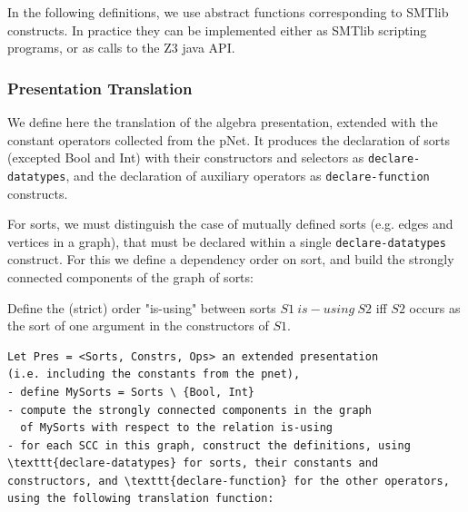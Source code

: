 \documentclass{lncs/llncs}
\newcommand{\TODO}[1]{\textcolor{red}{\textbf{[TODO:#1]}}}
\newcommand{\ERIC}[1]{\textcolor{blue}{#1}}
\begin{document}
\smallskip

In the following definitions, we use abstract functions corresponding to
SMTlib constructs. In practice they can be implemented either as
SMTlib scripting programs, or as calls to the Z3 java API.

\subsubsection{Presentation Translation} %
We define here the translation of the algebra presentation, extended
with the constant operators collected from the pNet. It produces the
declaration of sorts (excepted Bool and Int) with their constructors
and selectors as \texttt{declare-datatypes}, and the declaration of
auxiliary operators as \texttt{declare-function} constructs.

For sorts, we must distinguish the case of mutually defined sorts
(e.g. edges and vertices in a graph), that must be declared within a
single \texttt{declare-datatypes} construct. For this we define a
dependency order on sort, and build the strongly connected components
of the graph of sorts:

\begin{definition}
Define the (strict) order "is-using" between sorts $S1~ is-using~ S2$ iff $S2$
occurs as the sort of one argument in the constructors of $S1$.
\end{definition}


\begin{lstlisting}
Let Pres = <Sorts, Constrs, Ops> an extended presentation
(i.e. including the constants from the pnet),
- define MySorts = Sorts \ {Bool, Int}
- compute the strongly connected components in the graph
  of MySorts with respect to the relation is-using
- for each SCC in this graph, construct the definitions, using
\texttt{declare-datatypes} for sorts, their constants and
constructors, and \texttt{declare-function} for the other operators,
using the following translation function:
 
\end{lstlisting}
\end{document}

